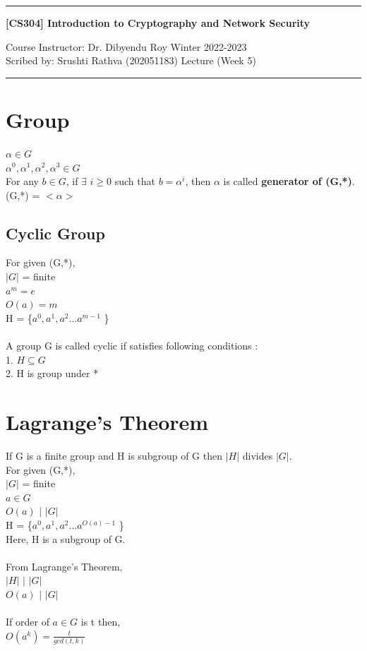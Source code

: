 \documentclass[11pt]{article}
\begin{document}
\noindent
\rule{\textwidth}{1pt}
\begin{center}
{\bf [CS304] Introduction to Cryptography and Network Security}
\end{center}
Course Instructor: Dr. Dibyendu Roy \hfill Winter 2022-2023\\
Scribed by: Srushti Rathva (202051183) \hfill Lecture (Week 5)
\\
\rule{\textwidth}{1pt}

\section*{Group}
$\alpha \in G$ \\
$ \alpha^{0}, \alpha^{1}, \alpha^{2}, \alpha^{3} \in G $ \\
For any $ b \in G $, if $\exists$ $i \geq 0$ such that $b = \alpha^{i}$, then $\alpha$ is called \textbf{generator of (G,*)}. \\
(G,*) = $< \alpha >$ 

\subsection*{Cyclic Group}
For given (G,*), \\
$|G|$ = finite \\
$a^{m} = e$ \\
$ O(a) = m$ \\
H = \{$ a^{0}, a^{1}, a^{2} ... a^{m-1} $ \} \\ \\
A group G is called cyclic if satisfies following conditions : \\
1. $ H \subseteq G$ \\
2. H is group under * \\

\section*{Lagrange's Theorem}
If G is a finite group and H is subgroup of G then $|H|$ divides $|G|$. \\
For given (G,*), \\
$|G|$ = finite \\
$a \in G $ \\
$O(a)$ $|$ $|G|$ \\
H = \{$ a^{0}, a^{1}, a^{2} ... a^{O(a)-1} $ \} \\
Here, H is a subgroup of G. \\ \\
From Lagrange's Theorem, \\
$|H|$ $|$ $|G|$ \\
$O(a)$ $|$ $|G|$ \\ \\
If order of $a \in G$ is t then,\\
$O(a^{k}) = \frac{t}{gcd(t,k)}$ \\
\end{document}
